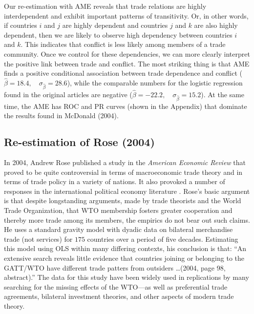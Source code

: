 Our re-estimation with AME reveals that trade relations are highly interdependent and exhibit important patterns of transitivity.  Or, in other words, if countries $i$ and $j$ are highly dependent and countries $j$ and $k$ are also highly dependent, then we are likely to observe high dependency between countries $i$ and $k$. This indicates that conflict is less likely among members of a trade community. Once we control for these dependencies, we can more clearly interpret the positive link between trade and conflict.  The most striking thing is that AME finds a positive conditional association between trade dependence and conflict ($\hat{\beta}= 18.4, \quad \sigma_{\hat{\beta}} = 28.6$), while the comparable numbers for the logistic regression found in the original articles are negative ($\hat{\beta}= -22.2, \quad \sigma_{\hat{\beta}} = 15.2$). At the same time, the AME has ROC and PR curves (shown in the Appendix) that dominate the results found in McDonald (2004).

\subsection{Re-estimation of Rose (2004)}

\nocite{rose:2004}
In 2004, Andrew Rose published a study in the \textit{American Economic Review} that proved to be quite controversial in terms of macroeconomic trade theory and in terms of trade policy in a variety of nations. It also provoked a number of responses in the international political economy literature \citep{tomz:etal:2007,ward:etal:2013}.  Rose's basic argument is that despite longstanding arguments, made by trade theorists and the World Trade Organization, that WTO membership fosters greater cooperation and thereby more trade among its members, the empirics do not bear out such claims. He uses a standard gravity model with dyadic data on bilateral merchandise trade (not services) for $175$ countries over a period of five decades. Estimating this model using OLS within many differing contexts, his conclusion is that: ``An extensive search reveals little evidence that countries joining or belonging to the GATT/WTO have different trade patters from outsiders \ldots (2004, page 98, abstract).''  The data for this study have been widely used in replications by many searching for the missing effects of the WTO---as well as preferential trade agreements, bilateral investment theories, and other aspects of modern trade theory.  

